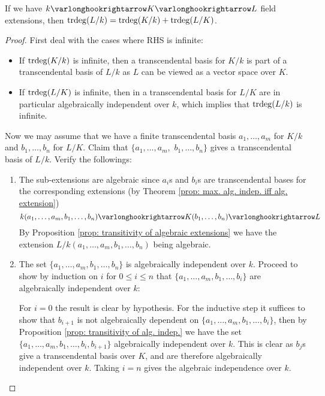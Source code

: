 \begin{proposition}\label{prop: trdeg is additive}
    If we have $k \ext K \ext L$ field extensions, then $\operatorname{trdeg}(L/k) = \operatorname{trdeg}(K/k) + \operatorname{trdeg}(L/K)$.
\end{proposition}

\begin{proof}
    First deal with the cases where RHS is infinite:
    \begin{itemize}[label=$-$]
        \item If $\operatorname{trdeg}(K/k)$ is infinite, then a transcendental basis for $K/k$ is part of a transcendental basis of $L/k$ as $L$ can be viewed as a vector space over $K$. 
        \item If $\operatorname{trdeg}(L/K)$ is infinite, then in a transcendental basis for $L/K$ are in particular algebraically independent over $k$, which implies that $\operatorname{trdeg}(L/k)$ is infinite.
    \end{itemize}
    Now we may assume that we have a finite transcendental basis $a_1, \dots, a_m$ for $K/k$ and $b_1, \dots, b_n$ for $L/K$. Claim that $\{a_1, \dots, a_m, $ $b_1, \dots, b_n\}$ gives a transcendental basis of $L/k$. Verify the followings:
    \begin{enumerate}[label=\arabic*)]
        \item The sub-extensions are algebraic since $a_i$s and $b_i$s are transcendental bases for the corresponding extensions (by Theorem \ref{prop: max. alg. indep. iff alg. extension})
        \[
            k(a_1, \dots, a_m, b_1, \dots, b_n) \ext K(b_1, \dots, b_n) \ext L
        \]
        By Proposition \ref{prop: transitivity of algebraic extensions} we have the extension $L/k(a_1, \dots, a_m, b_1, \dots, b_n)$ being algebraic. 
        \item The set $\{a_1, \dots, a_m, b_1, \dots, b_n\}$ is algebraically independent over $k$. Proceed to show by induction on $i$ for $0 \leq i \leq n$ that $\{a_1, \dots, a_m, b_1, \dots, b_i\}$ are algebraically independent over $k$:
        
        For $i = 0$ the result is clear by hypothesis. For the inductive step it suffices to show that $b_{i+1}$ is not algebraically dependent on $\{a_1, \dots, a_m, b_1, \dots, b_i\}$, then by Proposition \ref{prop: transitivity of alg. indep.} we have the set $\{a_1, \dots, a_m, b_1, \dots, b_i, b_{i+1}\}$ algebraically independent over $k$. This is clear as $b_j$s give a transcendental basis over $K$, and are therefore algebraically independent over $k$. Taking $i = n$ gives the algebraic independence over $k$. 
    \end{enumerate}
\end{proof}

